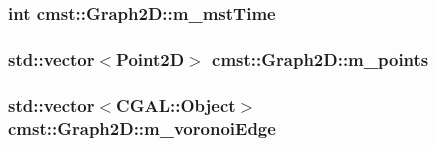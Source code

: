 \subsubsection[{\texorpdfstring{m\_mstTime}{m_mstTime}}]{\setlength{\rightskip}{0pt plus 5cm}int cmst::Graph2D::m\_mstTime\hspace{0.3cm}{\ttfamily [private]}}\hypertarget{classcmst_1_1_graph2_d_a447f3d36666c57d2f15bddc1e3126f1e}{}\label{classcmst_1_1_graph2_d_a447f3d36666c57d2f15bddc1e3126f1e}
\subsubsection[{\texorpdfstring{m\_points}{m_points}}]{\setlength{\rightskip}{0pt plus 5cm}std::vector$<${\bf Point2D}$>$ cmst::Graph2D::m\_points\hspace{0.3cm}{\ttfamily [protected]}}\hypertarget{classcmst_1_1_graph2_d_a32456f3c630e34a56ce3109183142c10}{}\label{classcmst_1_1_graph2_d_a32456f3c630e34a56ce3109183142c10}
\subsubsection[{\texorpdfstring{m\_voronoiEdge}{m_voronoiEdge}}]{\setlength{\rightskip}{0pt plus 5cm}std::vector$<$CGAL::Object$>$ cmst::Graph2D::m\_voronoiEdge\hspace{0.3cm}{\ttfamily [protected]}}\hypertarget{classcmst_1_1_graph2_d_a05e5ea6746bfd9d0ccd47308f4bbf1af}{}\label{classcmst_1_1_graph2_d_a05e5ea6746bfd9d0ccd47308f4bbf1af}
